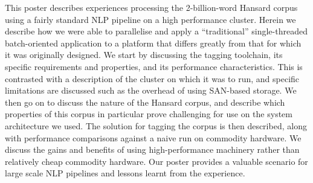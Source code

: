     This poster describes experiences processing the 2-billion-word Hansard corpus using a fairly standard NLP pipeline on a high performance cluster.  Herein we describe how we were able to parallelise and apply a ``traditional'' single-threaded batch-oriented application to a platform that differs greatly from that for which it was originally designed. We start by discussing the tagging toolchain, its specific requirements and properties, and its performance characteristics.  This is contrasted with a description of the cluster on which it was to run, and specific limitations are discussed such as the overhead of using SAN-based storage. We then go on to discuss the nature of the Hansard corpus, and describe which properties of this corpus in particular prove challenging for use on the system architecture we used. The solution for tagging the corpus is then described, along with performance comparisons against a naive run on commodity hardware.  We discuss the gains and benefits of using high-performance machinery rather than relatively cheap commodity hardware. Our poster provides a valuable scenario for large scale NLP pipelines and lessons learnt from the experience.


%
% 



